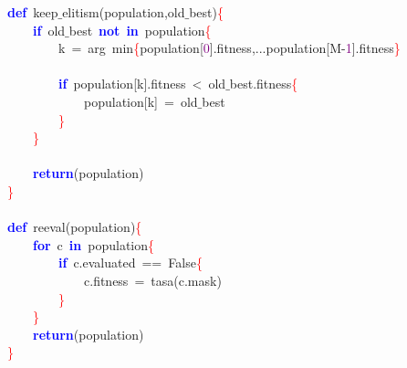 \noindent
\mbox{}\textbf{\textcolor{Blue}{def}}\ keep$\_$elitism\textcolor{BrickRed}{(}population\textcolor{BrickRed}{,}old$\_$best\textcolor{BrickRed}{)}\textcolor{Red}{\{} \\
\mbox{}\ \ \ \ \textbf{\textcolor{Blue}{if}}\ old$\_$best\ \textbf{\textcolor{Blue}{not}}\ \textbf{\textcolor{Blue}{in}}\ population\textcolor{Red}{\{} \\
\mbox{}\ \ \ \ \ \ \ \ k\ \textcolor{BrickRed}{=}\ arg\ min\textcolor{Red}{\{}population\textcolor{BrickRed}{[}\textcolor{Purple}{0}\textcolor{BrickRed}{].}fitness\textcolor{BrickRed}{,...}population\textcolor{BrickRed}{[}M\textcolor{BrickRed}{-}\textcolor{Purple}{1}\textcolor{BrickRed}{].}fitness\textcolor{Red}{\}} \\
\mbox{} \\
\mbox{}\ \ \ \ \ \ \ \ \textbf{\textcolor{Blue}{if}}\ population\textcolor{BrickRed}{[}k\textcolor{BrickRed}{].}fitness\ \textcolor{BrickRed}{\textless{}}\ old$\_$best\textcolor{BrickRed}{.}fitness\textcolor{Red}{\{} \\
\mbox{}\ \ \ \ \ \ \ \ \ \ \ \ population\textcolor{BrickRed}{[}k\textcolor{BrickRed}{]}\ \textcolor{BrickRed}{=}\ old$\_$best \\
\mbox{}\ \ \ \ \ \ \ \ \textcolor{Red}{\}} \\
\mbox{}\ \ \ \ \textcolor{Red}{\}} \\
\mbox{} \\
\mbox{}\ \ \ \ \textbf{\textcolor{Blue}{return}}\textcolor{BrickRed}{(}population\textcolor{BrickRed}{)} \\
\mbox{}\textcolor{Red}{\}} \\
\mbox{} \\
\mbox{}\textbf{\textcolor{Blue}{def}}\ reeval\textcolor{BrickRed}{(}population\textcolor{BrickRed}{)}\textcolor{Red}{\{} \\
\mbox{}\ \ \ \ \textbf{\textcolor{Blue}{for}}\ c\ \textbf{\textcolor{Blue}{in}}\ population\textcolor{Red}{\{} \\
\mbox{}\ \ \ \ \ \ \ \ \textbf{\textcolor{Blue}{if}}\ c\textcolor{BrickRed}{.}evaluated\ \textcolor{BrickRed}{==}\ False\textcolor{Red}{\{} \\
\mbox{}\ \ \ \ \ \ \ \ \ \ \ \ c\textcolor{BrickRed}{.}fitness\ \textcolor{BrickRed}{=}\ tasa\textcolor{BrickRed}{(}c\textcolor{BrickRed}{.}mask\textcolor{BrickRed}{)} \\
\mbox{}\ \ \ \ \ \ \ \ \textcolor{Red}{\}} \\
\mbox{}\ \ \ \ \textcolor{Red}{\}} \\
\mbox{}\ \ \ \ \textbf{\textcolor{Blue}{return}}\textcolor{BrickRed}{(}population\textcolor{BrickRed}{)} \\
\mbox{}\textcolor{Red}{\}} \\
\mbox{}
